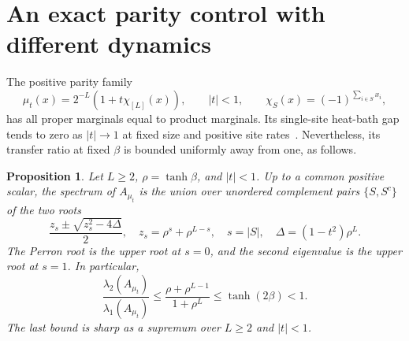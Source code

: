 \documentclass[11pt]{article}
\newtheorem{proposition}[theorem]{Proposition}
\begin{document}
\section{An exact parity control with different dynamics}
The positive parity family
\begin{equation}\label{eq:parity}
 \mu_t(x)=2^{-L}(1+t\chi_{[L]}(x)),\qquad |t|<1,
 \qquad \chi_S(x)=(-1)^{\sum_{i\in S}x_i},
\end{equation}
has all proper marginals equal to product marginals. Its single-site
heat-bath gap tends to zero as $|t|\to1$ at fixed size and positive site
rates~\cite{ErikssonParity}. Nevertheless, its transfer ratio at fixed
$\beta$ is bounded uniformly away from one, as follows.

\begin{proposition}\label{prop:parity}
Let $L\ge2$, $\rho=\tanh\beta$, and $|t|<1$. Up to a common positive
scalar, the spectrum of $A_{\mu_t}$ is the union over unordered complement
pairs $\{S,S^c\}$ of the two roots
\begin{equation}\label{eq:parityroots}
 \frac{z_s\pm\sqrt{z_s^2-4\Delta}}2,
 \quad z_s=\rho^s+\rho^{L-s},\quad s=|S|,
 \quad \Delta=(1-t^2)\rho^L.
\end{equation}
The Perron root is the upper root at $s=0$, and the second eigenvalue is
the upper root at $s=1$. In particular,
\begin{equation}\label{eq:paritybound}
 \frac{\lambda_2(A_{\mu_t})}{\lambda_1(A_{\mu_t})}
 \le\frac{\rho+\rho^{L-1}}{1+\rho^L}
 \le\tanh(2\beta)<1.
\end{equation}
The last bound is sharp as a supremum over $L\ge2$ and $|t|<1$.
\end{proposition}
\end{document}
